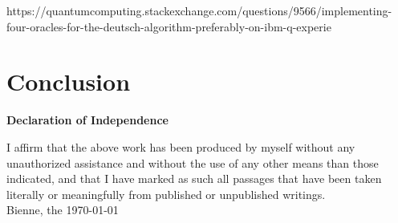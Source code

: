 \documentclass[12pt,a4paper]{scrartcl}
\begin{document}
https://quantumcomputing.stackexchange.com/questions/9566/implementing-four-oracles-for-the-deutsch-algorithm-preferably-on-ibm-q-experie



\section{Conclusion}


\markboth{}{}

\newpage





\newpage
\thispagestyle{empty}
\markboth{}{}
  \normalsize
\begin{center}
\huge{\textbf{ Declaration of Independence}}\\[40mm]
\end{center}
\large
I affirm that the above work has been produced by myself without any unauthorized assistance and without the use of any other means than those indicated, and that I have marked as such all passages that have been taken literally or meaningfully from published or unpublished writings.\\[50mm]
Bienne, the \today

\newpage
\end{document}
